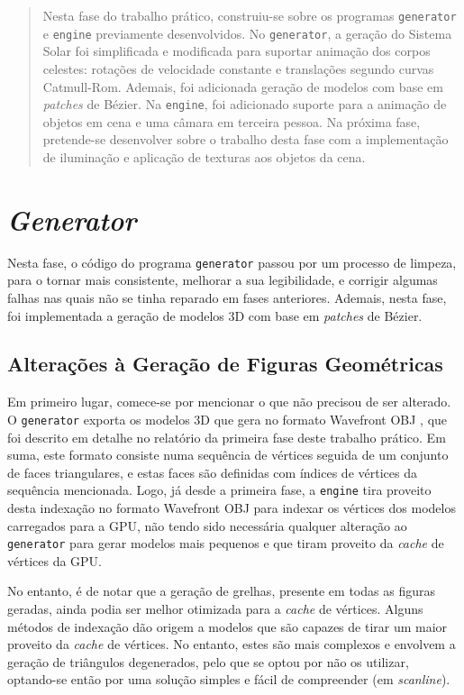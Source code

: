 \documentclass[12pt, a4paper]{article}
\begin{document}
\pagebreak

\begin{abstract}
    \noindent
    Nesta fase do trabalho prático, construiu-se sobre os programas \texttt{generator} e
    \texttt{engine} previamente desenvolvidos. No \texttt{generator}, a geração do Sistema Solar
    foi simplificada e modificada para suportar animação dos corpos celestes: rotações de velocidade
    constante e translações segundo curvas Catmull-Rom. Ademais, foi adicionada geração de modelos
    com base em \emph{patches} de Bézier. Na \texttt{engine}, foi adicionado suporte para a animação
    de objetos em cena e uma câmara em terceira pessoa. Na próxima fase, pretende-se desenvolver
    sobre o trabalho desta fase com a implementação de iluminação e aplicação de texturas aos
    objetos da cena.
\end{abstract}

\section{\emph{Generator}}

Nesta fase, o código do programa \texttt{generator} passou por um processo de limpeza, para o tornar
mais consistente, melhorar a sua legibilidade, e corrigir algumas falhas nas quais não se tinha
reparado em fases anteriores. Ademais, nesta fase, foi implementada a geração de modelos 3D com base
em \emph{patches} de Bézier.

\subsection{Alterações à Geração de Figuras Geométricas}

Em primeiro lugar, comece-se por mencionar o que não precisou de ser alterado. O \texttt{generator}
exporta os modelos 3D que gera no formato Wavefront OBJ \cite{wavefront-obj}, que foi descrito em
detalhe no relatório da primeira fase deste trabalho prático. Em suma, este formato consiste numa
sequência de vértices seguida de um conjunto de faces triangulares, e estas faces são definidas com
índices de vértices da sequência mencionada. Logo, já desde a primeira fase, a \texttt{engine} tira
proveito desta indexação no formato Wavefront OBJ para indexar os vértices dos modelos carregados
para a GPU, não tendo sido necessária qualquer alteração ao \texttt{generator} para gerar modelos
mais pequenos e que tiram proveito da \emph{cache} de vértices da GPU.

No entanto, é de notar que a geração de grelhas, presente em todas as figuras geradas, ainda podia
ser melhor otimizada para a \emph{cache} de vértices. Alguns métodos de indexação
\cite{optimal-grid} dão origem a modelos que são capazes de tirar um maior proveito da \emph{cache}
de vértices. No entanto, estes são mais complexos e envolvem a geração de triângulos degenerados,
pelo que se optou por não os utilizar, optando-se então por uma solução simples e fácil de
compreender (em \emph{scanline}).
\end{document}
